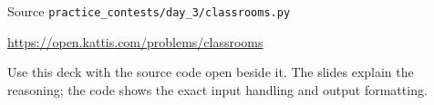 \documentclass[aspectratio=169,11pt]{beamer}
\begin{document}
\begin{frame}{Source}
\small
{} \texttt{practice\_contests/day\_3/classrooms.py}

\vspace{0.3cm}
 \url{https://open.kattis.com/problems/classrooms}

\vspace{0.45cm}
Use this deck with the source code open beside it. The slides explain the reasoning; the code shows the exact input handling and output formatting.
\end{frame}
\end{document}
